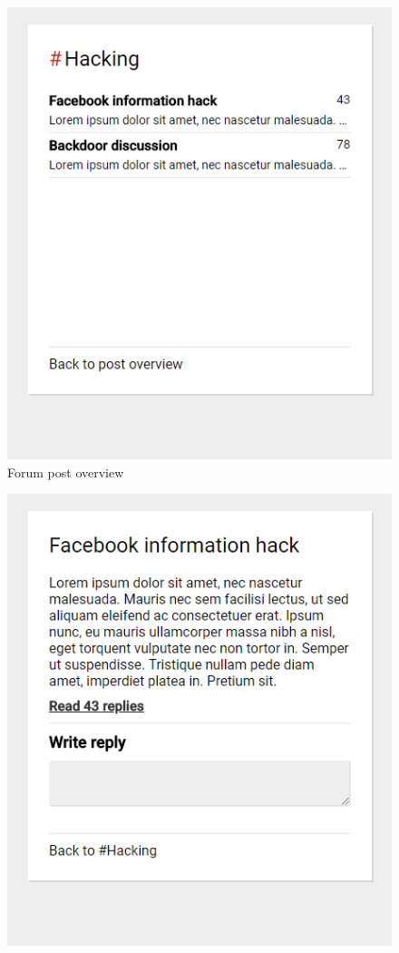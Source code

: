\begin{table}[H]
\begin{minipage}{.33\textwidth}
\begin{figure}[H]
            \includegraphics[width=0.95\linewidth]{InteraktionsDesign/Assets/Prototype/5.png}
            \caption{Forum post overview}
            \label{fig:prototype5}
        \end{figure}
    \end{minipage}
    \begin{minipage}{.33\textwidth}
        \begin{figure}[H]
            \centering
            \includegraphics[width=0.95\linewidth]{InteraktionsDesign/Assets/Prototype/6.png}

\end{figure}
\end{minipage}
\end{table}
